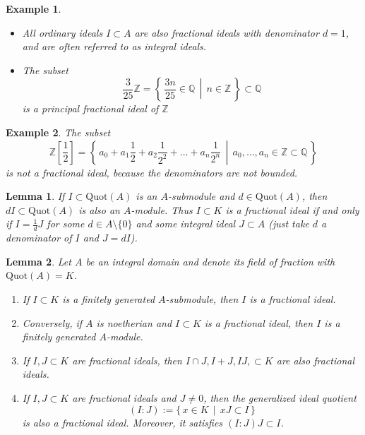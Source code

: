 \documentclass[a4paper]{book}
\theoremstyle{break}
\newtheorem{example}{Example}
\theoremstyle{plain}
\newtheorem{lemma}{Lemma}[definition]
\begin{document}
\begin{example}
    \begin{itemize}
        \item All ordinary ideals \(I \subset A\) are also fractional ideals with denominator \(d = 1\), and are often referred to as {\color{mathrem}integral ideals}.
        \item The subset
        \begin{equation}
            \frac{3}{25}\mathbb{Z} = \left\{\, \frac{3n}{25} \in \mathbb{Q} \,\middle|\, n \in \mathbb{Z} \,\right\} \subset \mathbb{Q}
        \end{equation}
        is a principal fractional ideal of \(\mathbb{Z}\)
    \end{itemize}
\end{example}

\begin{example}
    The subset
    \begin{equation}
        \mathbb{Z}\left[\frac{1}{2}\right] = \left\{\, a_0 + a_1 \frac{1}{2} + a_2 \frac{1}{2^2} + \dots + a_n \frac{1}{2^n} \,\middle|\, a_0, \dots, a_n \in \mathbb{Z} \subset \mathbb{Q} \,\right\}
    \end{equation}
    is not a fractional ideal, because the denominators are not bounded.
\end{example}

\begin{lemma}
    If \(I \subset \text{Quot}(A)\) is an \(A\)-submodule and \(d \in \text{Quot}(A)\), then \(dI \subset \text{Quot}(A)\) is also an \(A\)-module. Thus \(I \subset K\) is a fractional ideal if and only if \(I = \frac{1}{d} J\) for some \(d \in A \setminus \{0\}\) and some integral ideal \(J \subset A\) (just take \(d\) a denominator of \(I\) and \(J = dI\)).
\end{lemma}

\begin{lemma}
    Let \(A\) be an integral domain and denote its field of fraction with \(\text{Quot}(A) = K\).
    \begin{enumerate}
        \item If \(I \subset K\) is a finitely generated \(A\)-submodule, then \(I\) is a fractional ideal.
        \item Conversely, if \(A\) is noetherian and \(I \subset K\) is a fractional ideal, then \(I\) is a finitely generated \(A\)-module.
        \item If \(I, J \subset K\) are fractional ideals, then \(I \cap J, I + J, IJ, \subset K\) are also fractional ideals.
        \item If \(I, J \subset K\) are fractional ideals and \(J \neq {0}\), then the generalized ideal quotient
        \begin{equation}
            (I : J) := \{\, x \in K \, \mid \, xJ \subset I \,\}
        \end{equation}
        is also a fractional ideal. Moreover, it satisfies \((I : J)J \subset I\).
    \end{enumerate}
\end{lemma}
\end{document}
